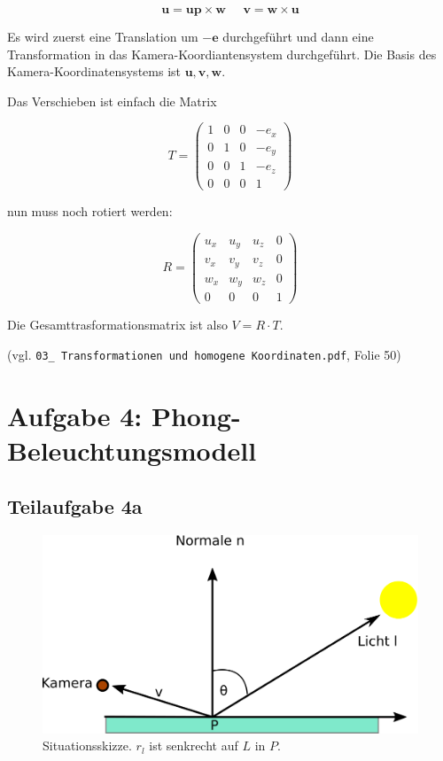 \documentclass[a4paper]{scrartcl}
\begin{document}
\[\mathbf{u} = \mathbf{up} \times \mathbf{w} \;\;\;\;\; \mathbf{v} = \mathbf{w} \times \mathbf{u}\]

Es wird zuerst eine Translation um $-\mathbf{e}$ durchgeführt und dann
eine Transformation in das Kamera-Koordiantensystem durchgeführt. Die Basis
des Kamera-Koordinatensystems ist $\mathbf{u}, \mathbf{v}, \mathbf{w}$.

Das Verschieben ist einfach die Matrix

\[T = \begin{pmatrix}
1 & 0 & 0 & -e_x\\
0 & 1 & 0 & -e_y\\
0 & 0 & 1 & -e_z\\
0 & 0 & 0 & 1\end{pmatrix}\]

nun muss noch rotiert werden:

\[R = \begin{pmatrix}
u_x & u_y & u_z & 0\\
v_x & v_y & v_z & 0\\
w_x & w_y & w_z & 0\\
0 & 0 & 0 & 1\end{pmatrix}\]

Die Gesamttrasformationsmatrix ist also $V = R \cdot T$.

(vgl. \texttt{03\_ Transformationen und homogene Koordinaten.pdf}, Folie 50)

\section*{Aufgabe 4: Phong-Beleuchtungsmodell}
\subsection*{Teilaufgabe 4a}

\begin{figure}[h]
    \centering
    \includegraphics*[width=0.8\linewidth, keepaspectratio]{reflection-angles.png}
    \caption{Situationsskizze. $r_l$ ist senkrecht auf $L$ in $P$.}
    \label{fig:situation-4a}
\end{figure}
\end{document}

